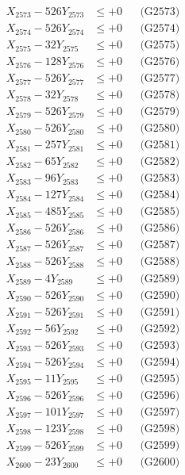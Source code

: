 \documentclass[a4paper,10pt]{article}
\begin{document}
{\begin{align}
X_{2573} - 526Y_{2573} &\leq +0 && \text{(G2573)} \\
X_{2574} - 526Y_{2574} &\leq +0 && \text{(G2574)} \\
X_{2575} - 32Y_{2575} &\leq +0 && \text{(G2575)} \\
X_{2576} - 128Y_{2576} &\leq +0 && \text{(G2576)} \\
X_{2577} - 526Y_{2577} &\leq +0 && \text{(G2577)} \\
X_{2578} - 32Y_{2578} &\leq +0 && \text{(G2578)} \\
X_{2579} - 526Y_{2579} &\leq +0 && \text{(G2579)} \\
X_{2580} - 526Y_{2580} &\leq +0 && \text{(G2580)} \\
\allowbreak
X_{2581} - 257Y_{2581} &\leq +0 && \text{(G2581)} \\
X_{2582} - 65Y_{2582} &\leq +0 && \text{(G2582)} \\
X_{2583} - 96Y_{2583} &\leq +0 && \text{(G2583)} \\
X_{2584} - 127Y_{2584} &\leq +0 && \text{(G2584)} \\
X_{2585} - 485Y_{2585} &\leq +0 && \text{(G2585)} \\
X_{2586} - 526Y_{2586} &\leq +0 && \text{(G2586)} \\
X_{2587} - 526Y_{2587} &\leq +0 && \text{(G2587)} \\
X_{2588} - 526Y_{2588} &\leq +0 && \text{(G2588)} \\
X_{2589} - 4Y_{2589} &\leq +0 && \text{(G2589)} \\
X_{2590} - 526Y_{2590} &\leq +0 && \text{(G2590)} \\
\allowbreak
X_{2591} - 526Y_{2591} &\leq +0 && \text{(G2591)} \\
X_{2592} - 56Y_{2592} &\leq +0 && \text{(G2592)} \\
X_{2593} - 526Y_{2593} &\leq +0 && \text{(G2593)} \\
X_{2594} - 526Y_{2594} &\leq +0 && \text{(G2594)} \\
X_{2595} - 11Y_{2595} &\leq +0 && \text{(G2595)} \\
X_{2596} - 526Y_{2596} &\leq +0 && \text{(G2596)} \\
X_{2597} - 101Y_{2597} &\leq +0 && \text{(G2597)} \\
X_{2598} - 123Y_{2598} &\leq +0 && \text{(G2598)} \\
X_{2599} - 526Y_{2599} &\leq +0 && \text{(G2599)} \\
X_{2600} - 23Y_{2600} &\leq +0 && \text{(G2600)} \\

\end{align}}
\end{document}
